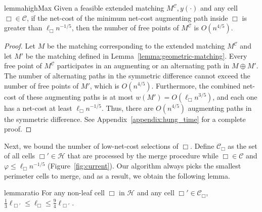 \documentclass[11pt,onecolumn]{article}
\def\mcC{{\mathcal{C}}}
\def\mcH{{\mathcal{H}}}
\newcommand{\cell}{\Box}
\newcommand{\current}{\mcC}
\newcommand{\ymax}{\varphi}
\begin{document}
\begin{restatable}{lemma}{highMax}\label{lemma:high-max}
    Given a feasible extended matching $M^\mcC, y(\cdot)$ and any cell $\cell\in\mcC$, if the net-cost of the minimum net-cost augmenting path inside $\cell$ is greater than $\ell_\cell n^{-1/5}$, then the number of free points of $M^\mcC$ is $O(n^{4/5})$.
\end{restatable}
\begin{proof}
    Let $M$ be the matching corresponding to the extended matching $M^\mcC$ and let $M'$ be the matching defined in Lemma~\ref{lemma:geometric-matching}. Every free point of $M^\mcC$ participates in an augmenting or an alternating path in $M\oplus M'$. The number of alternating paths in the symmetric difference cannot exceed the number of free points of $M'$, which is $O(n^{4/5})$. Furthermore, the combined net-cost of these augmenting paths is at most $w(M')=O(\ell_\cell n^{3/5})$, and each one has a net-cost at least $\ell_\cell n^{-1/5}$. Thus, there are $O(n^{4/5})$ augmenting paths in the symmetric difference. See Appendix~\ref{appendix:hung_time} for a complete proof.
\end{proof}

Next, we bound the number of low-net-cost selections of $\cell$. Define $\mcC_\cell$ as the set of all cells $\cell'\in\mcH$ that are processed by the merge procedure while $\cell\in\mcC$ and $\ymax\le \ell_\cell n^{-1/5}$ (Figure~\ref{fig:current}). Our algorithm always picks the smallest perimeter cells to merge, and as a result, we obtain the following lemma.
\begin{restatable}{lemma}{ratio}
\label{lemma:ratio}
For any non-leaf cell $\cell$ in $\mcH$ and any cell $\cell'\in\current_\cell$, $\frac{1}{3}\ell_{\cell'}\le \ell_\cell \le \frac{9}{4}\ell_{\cell'}$.
\end{restatable}
\end{document}
